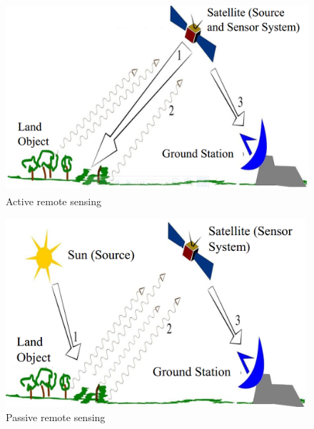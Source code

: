 \documentclass[document.tex]{subfiles}
\begin{document}
\begin{figure}[H]
	\begin{center}
		\includegraphics[height=7.0cm]{imgs/Active.png}
	\end{center}
	\caption{Active remote sensing\cite{32}}
	\label{fig: Active remote sensing}
\end{figure}
\vline
\begin{figure}[H]
	\begin{center}
		\includegraphics[height=7.0cm]{imgs/Passive.png}
	\end{center}
	\caption{Passive remote sensing\cite{32}}
	\label{fig: Passive remote sensing}
\end{figure}
\end{document}
